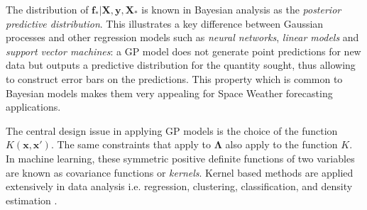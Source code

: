 The distribution of $\mathbf{f_*}| \mathbf{X},\mathbf{y},\mathbf{X_*}$ is known in Bayesian 
analysis as the \emph{posterior predictive distribution}. This illustrates a key difference between 
Gaussian processes and other regression models such as \emph{neural networks}, 
\emph{linear models} and \emph{support vector machines}: a GP model does not 
generate point predictions for new data but outputs a predictive distribution for the quantity 
sought, thus allowing to construct error bars on the predictions. This property which is common to 
Bayesian models makes them very appealing for Space Weather forecasting applications. 

The central design issue in applying GP models is the choice of the function 
$K(\mathbf{x}, \mathbf{x}')$. The same constraints that apply to $\mathbf{\Lambda}$ also apply to 
the function $K$. In machine learning, these symmetric positive definite functions of two variables 
are known as covariance functions or \emph{kernels}. Kernel based methods are applied extensively 
in data analysis \citep{Scholkopf:2001:LKS:559923,hofmann2008} i.e. regression, clustering, 
classification, and density estimation \citep{Girolami:2002:OSD:638929.638938}.

\begin{table}[ht]
    \caption{Popular Kernel functions used in GPR models}
    \label{table:kernel}
    \centering
\end{table}
    
